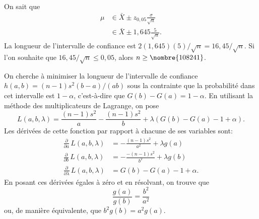 \begin{solution}{5.7}
    On sait que
    \begin{align*}
      \mu &\in \bar{X} \pm z_{0,05} \frac{\sigma}{\sqrt{n}} \\
      &\in \bar{X} \pm 1,645 \frac{5}{\sqrt{n}}.
    \end{align*}
    La longueur de l'intervalle de confiance est $2 (1,645) (5) /
    \sqrt{n} = 16,45/\sqrt{n}$. Si l'on souhaite que $16,45/\sqrt{n}
    \leq 0,05$, alors $n \geq \nombre{108 241}$.
  
\end{solution}
\begin{solution}{5.8}
    On cherche à minimiser la longueur de l'intervalle de confiance
    $h(a, b) = (n-1) s^2 (b - a)/(ab)$ sous la contrainte que la
    probabilité dans cet intervalle est $1 - \alpha$, c'est-à-dire que
    $G(b) - G(a) = 1 - \alpha$. En utilisant la méthode des
    multiplicateurs de Lagrange, on pose
    \begin{displaymath}
      L(a, b, \lambda) = \frac{(n-1) s^2}{a} - \frac{(n-1) s^2}{b} +
      \lambda(G(b) - G(a) - 1 + \alpha).
    \end{displaymath}
    Les dérivées de cette fonction par rapport à chacune de ses
    variables sont:
    \begin{align*}
      \frac{\partial}{\partial a}\, L(a, b, \lambda)
      &= - \frac{(n-1) s^2}{a^2} + \lambda g(a) \\
      \frac{\partial}{\partial b}\, L(a, b, \lambda)
      &= - \frac{-(n-1) s^2}{b^2} + \lambda g(b) \\
      \frac{\partial}{\partial \lambda}\, L(a, b, \lambda)
      &= G(b) - G(a) - 1 + \alpha.
    \end{align*}
    En posant ces dérivées égales à zéro et en résolvant, on trouve
    que
    \begin{equation*}
      \frac{g(a)}{g(b)} = \frac{b^2}{a^2}
    \end{equation*}
    ou, de manière équivalente, que $b^2 g(b) = a^2 g(a)$.
  
\end{solution}
